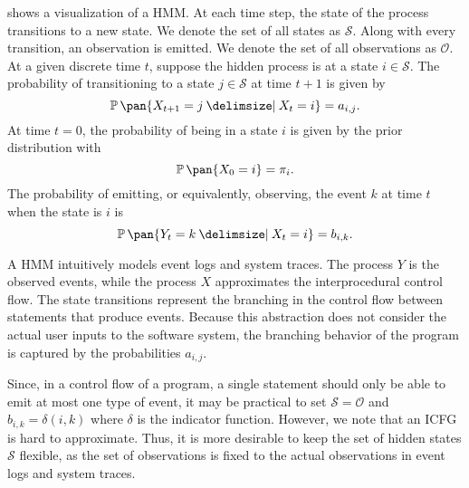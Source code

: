  shows a visualization of a HMM. At each time step, the state of the process transitions to a new state. We denote the set of all states as \(\mathcal{S}\). Along with every transition, an observation is emitted. We denote the set of all observations as \(\mathcal{O}\). At a given discrete time \(t\), suppose the hidden process is at a state \(i \in \mathcal{S}\). The probability of transitioning to a state \(j \in \mathcal{S}\) at time \(t+1\) is given by
\begin{equation}\label{eq:transition}
    \prob\pan{X_{t+1} = j \giv X_t = i} = a_{i,j}.
\end{equation}
At time \(t = 0\), the probability of being in a state \(i\) is given by the prior distribution with
\begin{equation}\label{eq:prior}
    \prob\pan{X_0 = i} = \pi_i.
\end{equation}
The probability of emitting, or equivalently, observing, the event \(k\) at time \(t\) when the state is \(i\) is
\begin{equation}\label{eq:emission}
    \prob\pan{Y_t = k \giv X_t = i} = b_{i,k}.
\end{equation}

A HMM intuitively models event logs and system traces. The process \(Y\) is the observed events, while the process \(X\) approximates the interprocedural control flow. The state transitions represent the branching in the control flow between statements that produce events. Because this abstraction does not consider the actual user inputs to the software system, the branching behavior of the program is captured by the probabilities \(a_{i,j}\).

Since, in a control flow of a program, a single statement should only be able to emit at most one type of event, it may be practical to set \(\mathcal{S} = \mathcal{O}\) and \(b_{i,k} = \delta(i,k)\) where \(\delta\) is the indicator function. However, we note that an ICFG is hard to approximate. Thus, it is more desirable to keep the set of hidden states \(\mathcal{S}\) flexible, as the set of observations is fixed to the actual observations in event logs and system traces.


